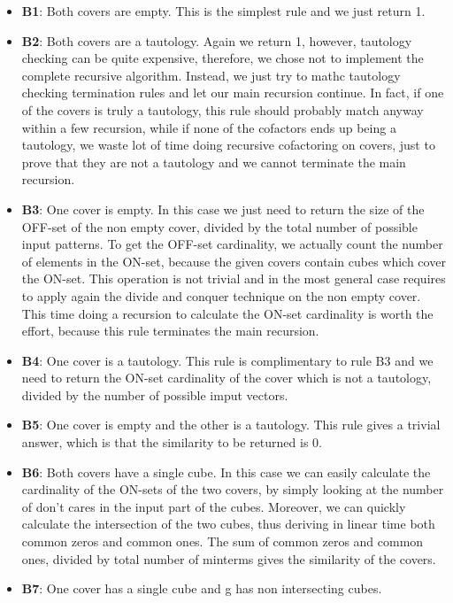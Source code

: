 \documentclass{acm_proc_article-sp}
\begin{document}
\begin{itemize}
  \item {\bf B1}: Both covers are empty. This is the simplest rule and we just
    return 1.
  \item {\bf B2}: Both covers are a tautology. Again we return 1, however,
    tautology checking can be quite expensive, therefore, we chose not to
    implement the complete recursive algorithm. Instead, we just try to mathc
    tautology checking termination rules and let our main recursion continue.
    In fact, if one of the covers is truly a tautology, this rule should probably
    match anyway within a few recursion, while if none of the cofactors ends
    up being a tautology, we waste lot of time doing recursive cofactoring on
    covers, just to prove that they are not a tautology and we cannot terminate
    the main recursion.
  \item {\bf B3}: One cover is empty. In this case we just need to return the
    size of the OFF-set of the non empty cover, divided by the total number of
    possible input patterns. To get the OFF-set cardinality, we actually count
    the number of elements in the ON-set, because the given covers contain cubes
    which cover the ON-set. This operation is not trivial and in the most general
    case requires to apply again the divide and conquer technique on the non
    empty cover. This time doing a recursion to calculate the ON-set cardinality
    is worth the effort, because this rule terminates the main recursion.
  \item {\bf B4}: One cover is a tautology. This rule is complimentary to rule B3
    and we need to return the ON-set cardinality of the cover which is not a
    tautology, divided by the number of possible imput vectors.
  \item {\bf B5}: One cover is empty and the other is a tautology. This rule gives
    a trivial answer, which is that the similarity to be returned is 0.
  \item {\bf B6}: Both covers have a single cube. In this case we can easily
    calculate the cardinality of the ON-sets of the two covers, by simply
    looking at the number of don't cares in the input part of the cubes.
    Moreover, we can quickly calculate the intersection of the two cubes, thus
    deriving in linear time both common zeros and common ones. The sum of common
    zeros and common ones, divided by total number of minterms gives the similarity
    of the covers.
  \item {\bf B7}: One cover has a single cube and g has non intersecting cubes.

\end{itemize}
\end{document}
